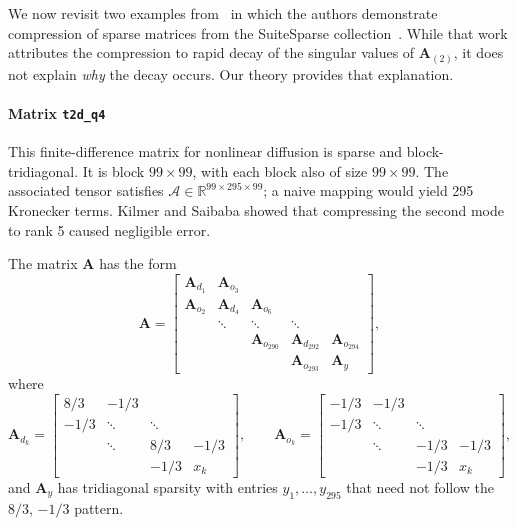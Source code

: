\documentclass{siamart251216}
\newcommand{\tens}[1]{\mathbf{\mathcal{#1}}}
\newcommand{\RRR}[3]{\mathbb{R}^{#1 \times #2 \times #3}}
\newcommand{\munfold}[2]{\mathbf{#1}_{(#2)}}
\def\bA{\mathbf{A}}
\begin{document}
We now revisit two examples from~\cite{kilmer2022matrixtensordecomp} in which the authors demonstrate compression of sparse matrices from the SuiteSparse collection~\cite{davis2011suite}. While that work attributes the compression to rapid decay of the singular values of $\munfold{A}{2}$, it does not explain \emph{why} the decay occurs. Our theory provides that explanation.

\paragraph{Matrix \texttt{t2d\_q4}}
This finite-difference matrix for nonlinear diffusion is sparse and block-tridiagonal. It is block $99\times 99$, with each block also of size $99\times 99$. The associated tensor satisfies $\tens{A}\in\RRR{99}{295}{99}$; a naive mapping would yield 295 Kronecker terms. Kilmer and Saibaba showed that compressing the second mode to rank 5 caused negligible error.

The matrix $\bA$ has the form
\begin{equation*}
    \bA = \left[\begin{matrix}
        \bA_{d_1} & \bA_{o_3} & &\\
        \bA_{o_2} & \bA_{d_4} & \bA_{o_6} &\\
        & \ddots & \ddots &  \ddots &\\
        & & \bA_{o_{290}} & \bA_{d_{292}} & \bA_{o_{294}} \\
        & & & \bA_{o_{293}} & \bA_y
    \end{matrix}\right],
\end{equation*}
where
\begin{equation*}
    \bA_{d_k} = \left[\begin{matrix}
        8/3 & -1/3 & \\
        -1/3 & \ddots & \ddots \\
        & \ddots & 8/3 &  -1/3 \\
        & & -1/3 & x_k 
    \end{matrix}\right],
    \qquad
    \bA_{o_k} = \left[\begin{matrix}
        -1/3 & -1/3 & \\
        -1/3 & \ddots & \ddots \\
        & \ddots & -1/3 &  -1/3 \\
        & & -1/3 & x_k 
    \end{matrix}\right],
\end{equation*}
and $\bA_y$ has tridiagonal sparsity with entries $y_1,\dots,y_{295}$ that need not follow the
$8/3$, $-1/3$ pattern.
\end{document}
